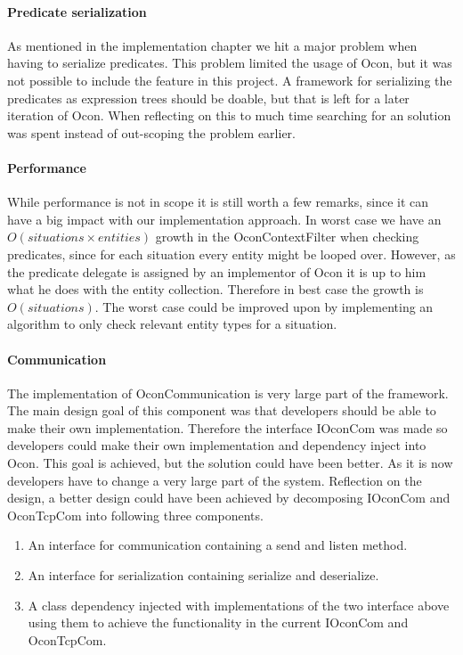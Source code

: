 \documentclass[../report.tex]{subfiles}
\begin{document}
\graphicspath{{img/}{../img/}}


\paragraph{Predicate serialization}
As mentioned in the implementation chapter we hit a major problem when having to serialize predicates. This problem limited the usage of Ocon, but it was not possible to include the feature in this project. A framework for serializing the predicates as expression trees should be doable, but that is left for a later iteration of Ocon. When reflecting on this to much time searching for an solution was spent instead of out-scoping the problem earlier. 

\paragraph{Performance}
While performance is not in scope it is still worth a few remarks, since it can have a big impact with our implementation approach. In worst case we have an $ O(situations\times entities) $ growth in the OconContextFilter when checking predicates, since for each situation every entity might be looped over. However, as the predicate delegate is assigned by an implementor of Ocon it is up to him what he does with the entity collection. Therefore in best case the growth is $ O(situations) $. The worst case could be improved upon by implementing an algorithm to only check relevant entity types for a situation.


\paragraph{Communication}
The implementation of OconCommunication is very large part of the framework. The main design goal of this component was that developers should be able to make their own implementation. Therefore the interface IOconCom was made so developers could make their own implementation and dependency inject into Ocon. This goal is achieved, but the solution could have been better. As it is now developers have to change a very large part of the system. Reflection on the design, a better design could have been achieved by decomposing IOconCom and OconTcpCom into following three components.

\begin{enumerate}
\item An interface for communication containing a send and listen method.
\item An interface for serialization containing serialize and deserialize.
\item A class dependency injected with implementations of the two interface above using them to achieve the functionality in the current IOconCom and OconTcpCom.
\end{enumerate}
\end{document}
